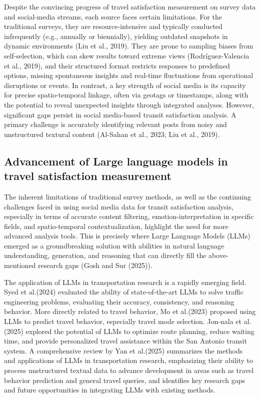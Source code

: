 \documentclass[a4paper,fleqn,12pt]{cas-sc}
\begin{document}
Despite the convincing progress of travel satisfaction measurement on survey data and social-media streams, each source faces certain limitations. For the traditional surveys, they are resource-intensive and typically conducted infrequently (e.g., annually or biennially), yielding outdated snapshots in dynamic environments (Liu et al., 2019). They are prone to sampling biases from self-selection, which can skew results toward extreme views (Rodríguez-Valencia et al., 2019), and their structured format restricts responses to predefined options, missing spontaneous insights and real-time fluctuations from operational disruptions or events. In contrast, a key strength of social media is its capacity for precise spatio-temporal linkage, often via geotags or timestamps, along with the potential to reveal unexpected insights through integrated analyses. However, significant gaps persist in social media-based transit satisfaction analysis. A primary challenge is accurately identifying relevant posts from noisy and unstructured textural content (Al-Sahan et al., 2023; Liu et al., 2019).

\subsection{Advancement of Large language models in travel satisfaction measurement}
The inherent limitations of traditional survey methods, as well as the continuing challenges faced in using social media data for transit satisfaction analysis, especially in terms of accurate content filtering, emotion-interpretation in specific fields, and spatio-temporal contextualization, highlight the need for more advanced analysis tools. This is precisely where Large Language Models (LLMs) emerged as a groundbreaking solution with abilities in natural language understanding, generation, and reasoning that can directly fill the above-mentioned research gaps (Gosh and Sur (2025)).

The application of LLMs in transportation research is a rapidly emerging field. Syed et al.(2024) evaluated the ability of state-of-the-art LLMs to solve traffic engineering problems, evaluating their accuracy, consistency, and reasoning behavior. More directly related to travel behavior, Mo et al.(2023) proposed using LLMs to predict travel behavior, especially travel mode selection. Jon-nala et al. (2025) explored the potential of LLMs to optimize route planning, reduce waiting time, and provide personalized travel assistance within the San Antonio transit system. A comprehensive review by Yan et al.(2025) summarizes the methods and applications of LLMs in transportation research, emphasizing their ability to process unstructured textual data to advance development in areas such as travel behavior prediction and general travel queries, and identifies key research gaps and future opportunities in integrating LLMs with existing methods.
\end{document}
